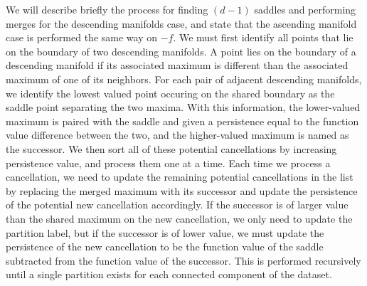 We will describe briefly the process for finding $(d-1)$ saddles and performing merges for the descending manifolds case, and state that the ascending manifold case is performed the same way on $-f$.
%
We must first identify all points that lie on the boundary of two descending manifolds.
%
A point lies on the boundary of a descending manifold if its associated maximum is different than the associated maximum of one of its neighbors.
%
For each pair of adjacent descending manifolds, we identify the lowest valued point occuring on the shared boundary as the saddle point separating the two maxima.
%
With this information, the lower-valued maximum is paired with the saddle and given a persistence equal to the function value difference between the two, and the higher-valued maximum is named as the successor.
%
We then sort all of these potential cancellations by increasing persistence value, and process them one at a time.
%
Each time we process a cancellation, we need to update the remaining potential cancellations in the list by replacing the merged maximum with its successor and update the persistence of the potential new cancellation accordingly.
%
If the successor is of larger value than the shared maximum on the new
cancellation, we only need to update the partition label, but if the successor is of lower value, we must update the persistence of the new cancellation to be the function value of the saddle subtracted from the function value of the successor.
%
This is performed recursively until a single partition exists for each connected component of the dataset.



% 